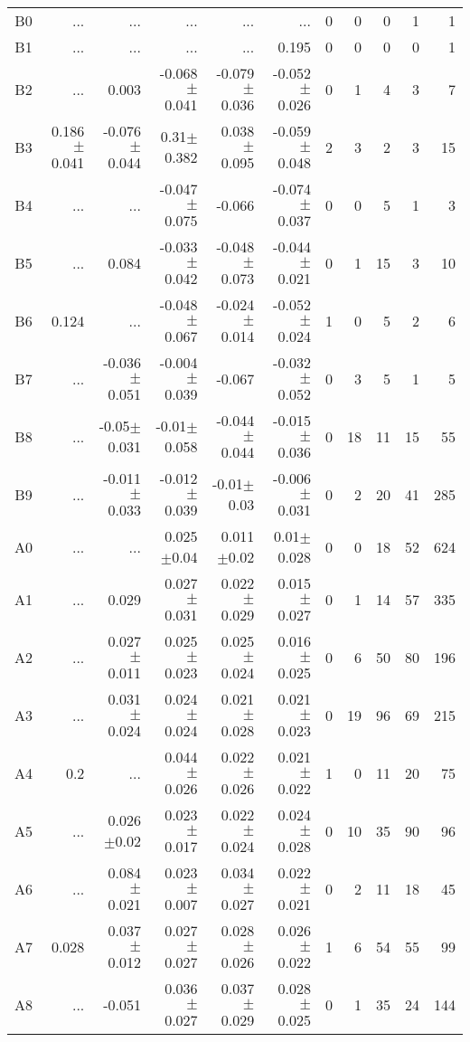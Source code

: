 \begin{table}[t]
\begin{table}[t]
\begin{center}
\begin{tabular}{c|rrrrr|rrrrr}
    B0	&	 ...	&	 ...	&	 ...	&	 ...	&	 ...	&	0	&	0	&	0	&	1	&	1	\\
    B1	&	 ...	&	 ...	&	 ...	&	 ...	&	0.195	&	0	&	0	&	0	&	0	&	1	\\
    B2	&	 ...	&	0.003	&	-0.068$\pm$0.041	&	-0.079$\pm$0.036	&	-0.052$\pm$0.026	&	0	&	1	&	4	&	3	&	7	\\
    B3	&	0.186$\pm$0.041	&	-0.076$\pm$0.044	&	0.31$\pm$0.382	&	0.038$\pm$0.095	&	-0.059$\pm$0.048	&	2	&	3	&	2	&	3	&	15	\\
    B4	&	 ...	&	 ...	&	-0.047$\pm$0.075	&	-0.066	&	-0.074$\pm$0.037	&	0	&	0	&	5	&	1	&	3	\\
    B5	&	 ...	&	0.084	&	-0.033$\pm$0.042	&	-0.048$\pm$0.073	&	-0.044$\pm$0.021	&	0	&	1	&	15	&	3	&	10	\\
    B6	&	0.124	&	 ...	&	-0.048$\pm$0.067	&	-0.024$\pm$0.014	&	-0.052$\pm$0.024	&	1	&	0	&	5	&	2	&	6	\\
    B7	&	 ...	&	-0.036$\pm$0.051	&	-0.004$\pm$0.039	&	-0.067	&	-0.032$\pm$0.052	&	0	&	3	&	5	&	1	&	5	\\
    B8	&	 ...	&	-0.05$\pm$0.031	&	-0.01$\pm$0.058	&	-0.044$\pm$0.044	&	-0.015$\pm$0.036	&	0	&	18	&	11	&	15	&	55	\\
    B9	&	 ...	&	-0.011$\pm$0.033	&	-0.012$\pm$0.039	&	-0.01$\pm$0.03	&	-0.006$\pm$0.031	&	0	&	2	&	20	&	41	&	285	\\
    A0	&	 ...	&	 ...	&	0.025$\pm$0.04	&	0.011$\pm$0.02	&	0.01$\pm$0.028	&	0	&	0	&	18	&	52	&	624	\\
    A1	&	 ...	&	0.029	&	0.027$\pm$0.031	&	0.022$\pm$0.029	&	0.015$\pm$0.027	&	0	&	1	&	14	&	57	&	335	\\
    A2	&	 ...	&	0.027$\pm$0.011	&	0.025$\pm$0.023	&	0.025$\pm$0.024	&	0.016$\pm$0.025	&	0	&	6	&	50	&	80	&	196	\\
    A3	&	 ...	&	0.031$\pm$0.024	&	0.024$\pm$0.024	&	0.021$\pm$0.028	&	0.021$\pm$0.023	&	0	&	19	&	96	&	69	&	215	\\
    A4	&	0.2	&	 ...	&	0.044$\pm$0.026	&	0.022$\pm$0.026	&	0.021$\pm$0.022	&	1	&	0	&	11	&	20	&	75	\\
    A5	&	 ...	&	0.026$\pm$0.02	&	0.023$\pm$0.017	&	0.022$\pm$0.024	&	0.024$\pm$0.028	&	0	&	10	&	35	&	90	&	96	\\
    A6	&	 ...	&	0.084$\pm$0.021	&	0.023$\pm$0.007	&	0.034$\pm$0.027	&	0.022$\pm$0.021	&	0	&	2	&	11	&	18	&	45	\\
    A7	&	0.028	&	0.037$\pm$0.012	&	0.027$\pm$0.027	&	0.028$\pm$0.026	&	0.026$\pm$0.022	&	1	&	6	&	54	&	55	&	99	\\
    A8	&	 ...	&	-0.051	&	0.036$\pm$0.027	&	0.037$\pm$0.029	&	0.028$\pm$0.025	&	0	&	1	&	35	&	24	&	144	\\

\end{tabular}
\end{center}
\end{table}
\end{table}

